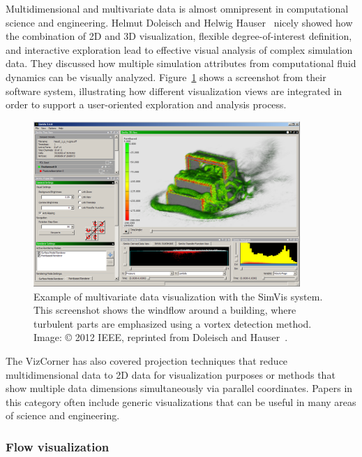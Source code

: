 \documentclass[10pt,journal,compsoc]{IEEEtran}
\begin{document}
Multidimensional and multivariate data is almost omnipresent in computational science and engineering. 
Helmut Doleisch and Helwig Hauser~\cite{Doleisch2012} nicely showed how the combination of 2D and 3D visualization, flexible degree-of-interest definition, and interactive exploration lead to effective visual analysis of complex simulation data. They discussed how multiple simulation attributes from computational fluid dynamics can be visually analyzed. Figure~\ref{fig:simvis} shows a screenshot from their software system, illustrating how different visualization views are integrated in order to support a user-oriented exploration and analysis process.

\begin{figure}
    \begin{center}    
        \includegraphics[width=0.9\textwidth]{simvis.png}
        \caption{Example of multivariate data visualization with the SimVis system. This screenshot shows the windflow around a building, where turbulent parts are emphasized using a vortex detection method. Image: \copyright{} 2012 IEEE, reprinted from Doleisch and Hauser~\cite{Doleisch2012}.
  \label{fig:simvis}}        
    \end{center}
\end{figure}

The VizCorner has also covered projection techniques that reduce multidimensional data to 2D data for visualization purposes or methods that show multiple data dimensions simultaneously via parallel coordinates. Papers in this category often include generic visualizations that can be useful in many areas of science and engineering.

\subsubsection*{Flow visualization}
\end{document}
